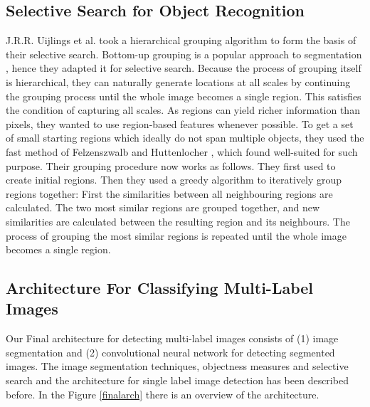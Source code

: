 \subsection{Selective Search for Object Recognition}


J.R.R. Uijlings et al. \cite{16} took a hierarchical grouping algorithm to form the basis of their
selective search. Bottom-up grouping is a popular approach to segmentation \cite{24} \cite{25}, hence they adapted it for selective search. Because
the process of grouping itself is hierarchical, they can naturally generate locations at all scales by continuing the grouping process until
the whole image becomes a single region. This satisfies the condition of capturing all scales.
As regions can yield richer information than pixels, they wanted to
use region-based features whenever possible. To get a set of small
starting regions which ideally do not span multiple objects, they used the fast method of Felzenszwalb and Huttenlocher \cite{25}, which
found well-suited for such purpose.
Their grouping procedure now works as follows. They first used \cite{25}
to create initial regions. Then they used a greedy algorithm to iteratively group regions together: First the similarities between all
neighbouring regions are calculated. The two most similar regions
are grouped together, and new similarities are calculated between
the resulting region and its neighbours. The process of grouping
the most similar regions is repeated until the whole image becomes
a single region.


\subsection{Architecture For Classifying Multi-Label Images}

Our Final architecture for detecting multi-label images consists of (1) image segmentation and (2) convolutional neural network for detecting segmented images. The image segmentation techniques, objectness measures and selective search and the architecture for single label image detection has been described before. In the Figure \ref{finalarch} there is an overview of the architecture. \hfill \break

